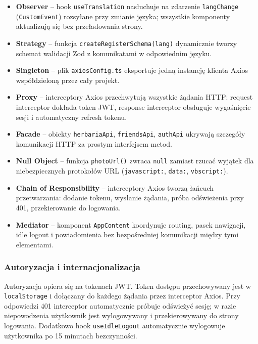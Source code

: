 \documentclass[12pt,a4paper]{article}
\begin{document}
\begin{itemize}[label=\textbullet, leftmargin=1.5cm]
    \item \textbf{Observer} -- hook \texttt{useTranslation} nas\l{}uchuje na zdarzenie \texttt{langChange} (\texttt{CustomEvent}) rozsy\l{}ane przy zmianie j\k{e}zyka; wszystkie komponenty aktualizuj\k{a} si\k{e} bez prze\l{}adowania strony.
    \item \textbf{Strategy} -- funkcja \texttt{createRegisterSchema(lang)} dynamicznie tworzy schemat walidacji Zod z komunikatami w odpowiednim j\k{e}zyku.
    \item \textbf{Singleton} -- plik \texttt{axiosConfig.ts} eksportuje jedn\k{a} instancj\k{e} klienta Axios wsp\'o\l{}dzielon\k{a} przez ca\l{}y projekt.
    \item \textbf{Proxy} -- interceptory Axios przechwytuj\k{a} wszystkie \.z\k{a}dania HTTP: request interceptor dok\l{}ada token JWT, response interceptor obs\l{}uguje wyga\'sni\k{e}cie sesji i automatyczny refresh tokenu.
    \item \textbf{Facade} -- obiekty \texttt{herbariaApi}, \texttt{friendsApi}, \texttt{authApi} ukrywaj\k{a} szczeg\'o\l{}y komunikacji HTTP za prostym interfejsem metod.
    \item \textbf{Null Object} -- funkcja \texttt{photoUrl()} zwraca \texttt{null} zamiast rzuca\'c wyj\k{a}tek dla niebezpiecznych protoko\l{}\'ow URL (\texttt{javascript:}, \texttt{data:}, \texttt{vbscript:}).
    \item \textbf{Chain of Responsibility} -- interceptory Axios tworz\k{a} \l{}a\'ncuch przetwarzania: dodanie tokenu, wys\l{}anie \.z\k{a}dania, pr\'oba od\'swie\.zenia przy 401, przekierowanie do logowania.
    \item \textbf{Mediator} -- komponent \texttt{AppContent} koordynuje routing, pasek nawigacji, idle logout i powiadomienia bez bezpo\'sredniej komunikacji mi\k{e}dzy tymi elementami.
\end{itemize}

\subsubsection{Autoryzacja i internacjonalizacja}

Autoryzacja opiera si\k{e} na tokenach JWT. Token dost\k{e}pu przechowywany jest w \texttt{localStorage} i do\l{}\k{a}czany do ka\.zdego \.z\k{a}dania przez interceptor Axios. Przy odpowiedzi 401 interceptor automatycznie pr\'obuje od\'swie\.zy\'c sesj\k{e}; w razie niepowodzenia u\.zytkownik jest wylogowywany i przekierowywany do strony logowania. Dodatkowo hook \texttt{useIdleLogout} automatycznie wylogowuje u\.zytkownika po 15 minutach bezczynno\'sci.
\end{document}
